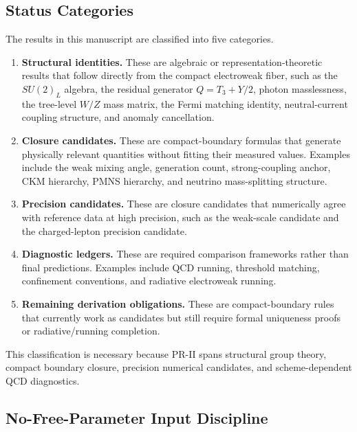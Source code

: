 \documentclass[11pt]{article}
\begin{document}
\subsection{Status Categories}
\label{sec:pr2_status_categories}

The results in this manuscript are classified into five categories.

\begin{enumerate}
    \item \textbf{Structural identities.} 
    These are algebraic or representation-theoretic results that follow directly from the compact electroweak fiber, such as the \(SU(2)_L\) algebra, the residual generator \(Q=T_3+Y/2\), photon masslessness, the tree-level \(W/Z\) mass matrix, the Fermi matching identity, neutral-current coupling structure, and anomaly cancellation.

    \item \textbf{Closure candidates.} 
    These are compact-boundary formulas that generate physically relevant quantities without fitting their measured values. 
    Examples include the weak mixing angle, generation count, strong-coupling anchor, CKM hierarchy, PMNS hierarchy, and neutrino mass-splitting structure.

    \item \textbf{Precision candidates.} 
    These are closure candidates that numerically agree with reference data at high precision, such as the weak-scale candidate and the charged-lepton precision candidate.

    \item \textbf{Diagnostic ledgers.} 
    These are required comparison frameworks rather than final predictions. 
    Examples include QCD running, threshold matching, confinement conventions, and radiative electroweak running.

    \item \textbf{Remaining derivation obligations.} 
    These are compact-boundary rules that currently work as candidates but still require formal uniqueness proofs or radiative/running completion.
\end{enumerate}

This classification is necessary because PR-II spans structural group theory, compact boundary closure, precision numerical candidates, and scheme-dependent QCD diagnostics.

\subsection{No-Free-Parameter Input Discipline}
\label{sec:pr2_no_free_parameter_input_discipline}
\end{document}
